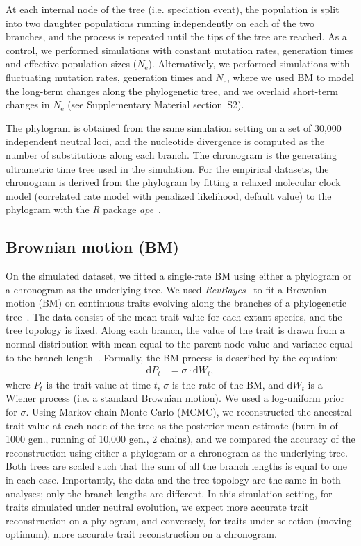 \documentclass{article}
\newcommand{\Multiply}{\cdot}
\newcommand{\der}{\mathrm{d}}
\newcommand{\Ne}{N_{\text{e}}}
\newcommand{\Trait}{P}
\begin{document}
At each internal node of the tree (i.e. speciation event), the population is split into two daughter populations running independently on each of the two branches, and the process is repeated until the tips of the tree are reached.
As a control, we performed simulations with constant mutation rates, generation times and effective population sizes ($\Ne$).
Alternatively, we performed simulations with fluctuating mutation rates, generation times and $\Ne$, where we used BM to model the long-term changes along the phylogenetic tree, and we overlaid short-term changes in $\Ne$ (see Supplementary Material section~S2).

The phylogram is obtained from the same simulation setting on a set of 30,000 independent neutral loci, and the nucleotide divergence is computed as the number of substitutions along each branch.
The chronogram is the generating ultrametric time tree used in the simulation.
For the empirical datasets, the chronogram is derived from the phylogram by fitting a relaxed molecular clock model (correlated rate model with penalized likelihood, default value) to the phylogram with the \textit{R} package \textit{ape}~\citep{paradis_ape_2004}.

\subsection*{Brownian motion (BM)}
On the simulated dataset, we fitted a single-rate BM using either a phylogram or a chronogram as the underlying tree.
We used \textit{RevBayes}~\citep{hohna_revbayes_2016} to fit a Brownian motion (BM) on continuous traits evolving along the branches of a phylogenetic tree~\citep{felsenstein_phylogenies_1985, felsenstein_phylogenies_1988a}.
The data consist of the mean trait value for each extant species, and the tree topology is fixed.
Along each branch, the value of the trait is drawn from a normal distribution with mean equal to the parent node value and variance equal to the branch length~\citep{felsenstein_phylogenies_1985}.
Formally, the BM process is described by the equation:
\begin{align}
    \der \Trait_t & = \sigma \Multiply \der W_t,  \label{eq:bm-process}
\end{align}
where $\Trait_t$ is the trait value at time $t$, $\sigma$ is the rate of the BM, and $\der W_t$ is a Wiener process (i.e. a standard Brownian motion).
We used a log-uniform prior for $\sigma$.
Using Markov chain Monte Carlo (MCMC), we reconstructed the ancestral trait value at each node of the tree as the posterior mean estimate (burn-in of 1000 gen., running of 10,000 gen., 2 chains), and we compared the accuracy of the reconstruction using either a phylogram or a chronogram as the underlying tree.
Both trees are scaled such that the sum of all the branch lengths is equal to one in each case.
Importantly, the data and the tree topology are the same in both analyses; only the branch lengths are different.
In this simulation setting, for traits simulated under neutral evolution, we expect more accurate trait reconstruction on a phylogram, and conversely, for traits under selection (moving optimum), more accurate trait reconstruction on a chronogram.
\end{document}

